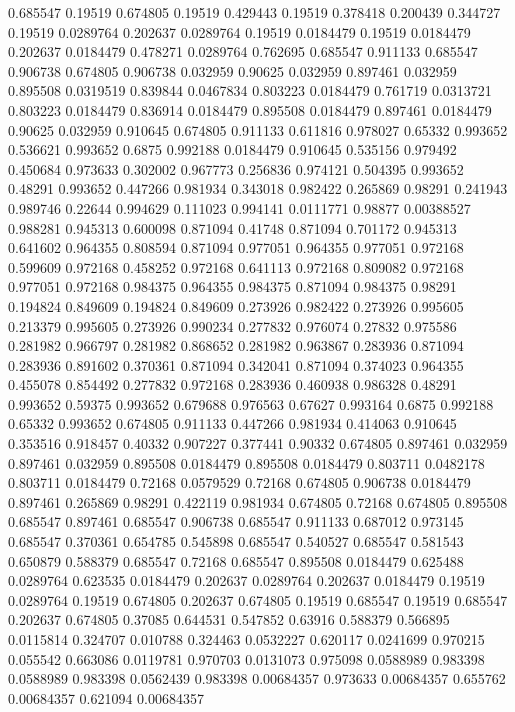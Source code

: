 0.685547 0.19519
0.674805 0.19519
0.429443 0.19519
0.378418 0.200439
0.344727 0.19519
0.0289764 0.202637
0.0289764 0.19519
0.0184479 0.19519
0.0184479 0.202637
0.0184479 0.478271
0.0289764 0.762695
0.685547 0.911133
0.685547 0.906738
0.674805 0.906738
0.032959 0.90625
0.032959 0.897461
0.032959 0.895508
0.0319519 0.839844
0.0467834 0.803223
0.0184479 0.761719
0.0313721 0.803223
0.0184479 0.836914
0.0184479 0.895508
0.0184479 0.897461
0.0184479 0.90625
0.032959 0.910645
0.674805 0.911133
0.611816 0.978027
0.65332 0.993652
0.536621 0.993652
0.6875 0.992188
0.0184479 0.910645
0.535156 0.979492
0.450684 0.973633
0.302002 0.967773
0.256836 0.974121
0.504395 0.993652
0.48291 0.993652
0.447266 0.981934
0.343018 0.982422
0.265869 0.98291
0.241943 0.989746
0.22644 0.994629
0.111023 0.994141
0.0111771 0.98877
0.00388527 0.988281
0.945313 0.600098
0.871094 0.41748
0.871094 0.701172
0.945313 0.641602
0.964355 0.808594
0.871094 0.977051
0.964355 0.977051
0.972168 0.599609
0.972168 0.458252
0.972168 0.641113
0.972168 0.809082
0.972168 0.977051
0.972168 0.984375
0.964355 0.984375
0.871094 0.984375
0.98291 0.194824
0.849609 0.194824
0.849609 0.273926
0.982422 0.273926
0.995605 0.213379
0.995605 0.273926
0.990234 0.277832
0.976074 0.27832
0.975586 0.281982
0.966797 0.281982
0.868652 0.281982
0.963867 0.283936
0.871094 0.283936
0.891602 0.370361
0.871094 0.342041
0.871094 0.374023
0.964355 0.455078
0.854492 0.277832
0.972168 0.283936
0.460938 0.986328
0.48291 0.993652
0.59375 0.993652
0.679688 0.976563
0.67627 0.993164
0.6875 0.992188
0.65332 0.993652
0.674805 0.911133
0.447266 0.981934
0.414063 0.910645
0.353516 0.918457
0.40332 0.907227
0.377441 0.90332
0.674805 0.897461
0.032959 0.897461
0.032959 0.895508
0.0184479 0.895508
0.0184479 0.803711
0.0482178 0.803711
0.0184479 0.72168
0.0579529 0.72168
0.674805 0.906738
0.0184479 0.897461
0.265869 0.98291
0.422119 0.981934
0.674805 0.72168
0.674805 0.895508
0.685547 0.897461
0.685547 0.906738
0.685547 0.911133
0.687012 0.973145
0.685547 0.370361
0.654785 0.545898
0.685547 0.540527
0.685547 0.581543
0.650879 0.588379
0.685547 0.72168
0.685547 0.895508
0.0184479 0.625488
0.0289764 0.623535
0.0184479 0.202637
0.0289764 0.202637
0.0184479 0.19519
0.0289764 0.19519
0.674805 0.202637
0.674805 0.19519
0.685547 0.19519
0.685547 0.202637
0.674805 0.37085
0.644531 0.547852
0.63916 0.588379
0.566895 0.0115814
0.324707 0.010788
0.324463 0.0532227
0.620117 0.0241699
0.970215 0.055542
0.663086 0.0119781
0.970703 0.0131073
0.975098 0.0588989
0.983398 0.0588989
0.983398 0.0562439
0.983398 0.00684357
0.973633 0.00684357
0.655762 0.00684357
0.621094 0.00684357

